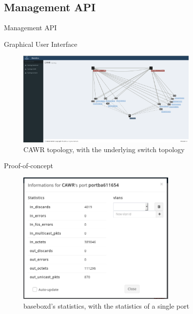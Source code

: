 \documentclass[aspectratio=43]{beamer}
\begin{document}
\subsection{Management API}

\begin{frame}[plain]
    \centering
        \Huge{Management API}
\end{frame}

\begin{frame}{Graphical User Interface}
    \begin{figure}[!tbph]
      \centering
      \includegraphics[width=0.8\textwidth]{bisdn/cawr_gui}
      \caption {CAWR topology, with the underlying switch topology}
    \end{figure}
\end{frame}

\begin{frame}{Proof-of-concept}
    \begin{figure}[!tbph]
      \centering
      \includegraphics[width=0.7\textwidth]{bisdn/basebox_gui}
      \caption {baseboxd's statistics, with the statistics of a single port}
    \end{figure}
\end{frame}
\end{document}
